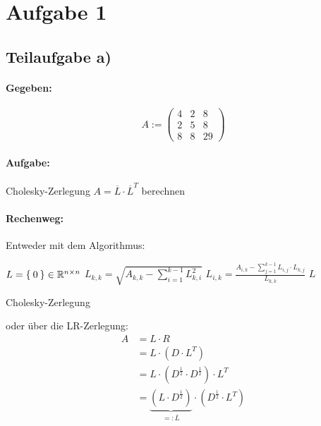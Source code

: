 \section*{Aufgabe 1}
\subsection*{Teilaufgabe a)}

\paragraph{Gegeben:}

\[A := \begin{pmatrix}
4 & 2 & 8\\
2 & 5 & 8\\
8 & 8 & 29
\end{pmatrix}\]

\paragraph{Aufgabe:} Cholesky-Zerlegung $A = \overline{L} \cdot \overline{L}^T$ berechnen

\paragraph{Rechenweg:}
Entweder mit dem Algorithmus:
\begin{algorithm}[H]
    \begin{algorithmic}
            \State $L = \Set{0} \in \mathbb{R}^{n \times n}$ 
                \State $L_{k,k} = \sqrt{A_{k,k} - \sum_{i=1}^{k-1} L_{k,i}^2}$
                    \State $L_{i,k} = \frac{A_{i,k} - \sum_{j=1}^{k-1} L_{i,j} \cdot L_{k,j}}{L_{k,k}}$
                \EndFor
            \EndFor
            \State \Return $L$
        \EndFunction
    \end{algorithmic}
\caption{Cholesky-Zerlegung}
\label{alg:seq1}
\end{algorithm}

oder über die LR-Zerlegung:
\begin{align}
    A &= L\cdot R\\
      &= L\cdot(D\cdot L^T)\\
      &= L\cdot(D^\frac{1}{2} \cdot D^\frac{1}{2})\cdot L^T\\
      &= \underbrace{(L\cdot D^\frac{1}{2})}_{=: \overline{L}} \cdot (D^\frac{1}{2} \cdot L^T)
\end{align}

